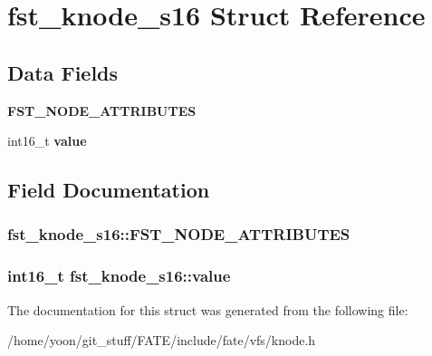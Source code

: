 \hypertarget{structfst__knode__s16}{\section{fst\-\_\-knode\-\_\-s16 Struct Reference}
\label{structfst__knode__s16}
}
\subsection*{Data Fields}
\begin{DoxyCompactItemize}
\item 
\hypertarget{structfst__knode__s16_a7c6dd7515be63970124c796a7e0473ad}{{\bfseries F\-S\-T\-\_\-\-N\-O\-D\-E\-\_\-\-A\-T\-T\-R\-I\-B\-U\-T\-E\-S}}\label{structfst__knode__s16_a7c6dd7515be63970124c796a7e0473ad}

\item 
\hypertarget{structfst__knode__s16_a468fff121bf0903b463b55a16d2cb188}{int16\-\_\-t {\bfseries value}}\label{structfst__knode__s16_a468fff121bf0903b463b55a16d2cb188}

\end{DoxyCompactItemize}


\subsection{Field Documentation}
\hypertarget{structfst__knode__s16_a7c6dd7515be63970124c796a7e0473ad}{
\subsubsection[{F\-S\-T\-\_\-\-N\-O\-D\-E\-\_\-\-A\-T\-T\-R\-I\-B\-U\-T\-E\-S}]{\setlength{\rightskip}{0pt plus 5cm}fst\-\_\-knode\-\_\-s16\-::\-F\-S\-T\-\_\-\-N\-O\-D\-E\-\_\-\-A\-T\-T\-R\-I\-B\-U\-T\-E\-S}}\label{structfst__knode__s16_a7c6dd7515be63970124c796a7e0473ad}
\hypertarget{structfst__knode__s16_a468fff121bf0903b463b55a16d2cb188}{
\subsubsection[{value}]{\setlength{\rightskip}{0pt plus 5cm}int16\-\_\-t fst\-\_\-knode\-\_\-s16\-::value}}\label{structfst__knode__s16_a468fff121bf0903b463b55a16d2cb188}


The documentation for this struct was generated from the following file\-:\begin{DoxyCompactItemize}
\item 
/home/yoon/git\-\_\-stuff/\-F\-A\-T\-E/include/fate/vfs/knode.\-h\end{DoxyCompactItemize}

